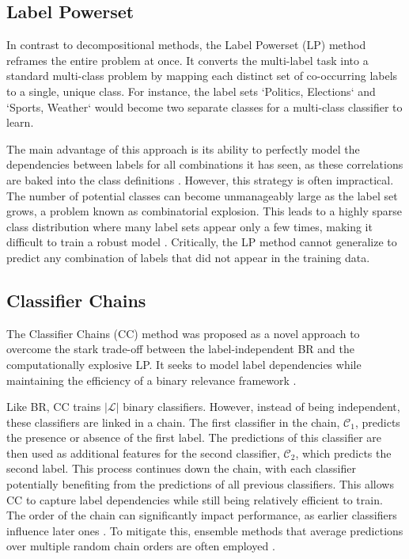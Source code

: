 \subsection{Label Powerset}
In contrast to decompositional methods, the Label Powerset (LP) method reframes the entire problem at once. It converts the multi-label task into a standard multi-class problem by mapping each distinct set of co-occurring labels to a single, unique class. For instance, the label sets `{Politics, Elections}` and `{Sports, Weather}` would become two separate classes for a multi-class classifier to learn. \cite{Read2011}

The main advantage of this approach is its ability to perfectly model the dependencies between labels for all combinations it has seen, as these correlations are baked into the class definitions \cite{Sucar2014Multi-label}. However, this strategy is often impractical. The number of potential classes can become unmanageably large as the label set grows, a problem known as combinatorial explosion. This leads to a highly sparse class distribution where many label sets appear only a few times, making it difficult to train a robust model \cite{Cherman2011}. Critically, the LP method cannot generalize to predict any combination of labels that did not appear in the training data.

\subsection{Classifier Chains}
The Classifier Chains (CC) method was proposed as a novel approach to overcome the stark trade-off between the label-independent BR and the computationally explosive LP. It seeks to model label dependencies while maintaining the efficiency of a binary relevance framework \cite{Read2011}.

Like BR, CC trains $|\mathcal{L}|$ binary classifiers. However, instead of being independent, these classifiers are linked in a chain. The first classifier in the chain, $\mathcal{C}_1$, predicts the presence or absence of the first label. The predictions of this classifier are then used as additional features for the second classifier, $\mathcal{C}_2$, which predicts the second label. This process continues down the chain, with each classifier potentially benefiting from the predictions of all previous classifiers. This allows CC to capture label dependencies while still being relatively efficient to train. \cite{Read2011} The order of the chain can significantly impact performance, as earlier classifiers influence later ones \cite{Read2021}. To mitigate this, ensemble methods that average predictions over multiple random chain orders are often employed \cite{Sucar2014Multi-label,Zhang2018}.

